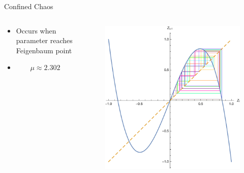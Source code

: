 \documentclass{beamer}
\begin{document}
\begin{frame}{Confined Chaos}
	\begin{columns}
		\begin{column}{0.5\textwidth}
			\begin{itemize}
				\item
					\centering
					Occurs when parameter reaches Feigenbaum point

				\item
					\begin{equation*}
						\mu\approx2.302
					\end{equation*}
			\end{itemize}
		\end{column}
		\begin{column}{0.5\textwidth}
			\begin{figure}
				\centering
				\includegraphics[width=\textwidth]{contained_chaos.pdf}
			\end{figure}
		\end{column}
	\end{columns}
\end{frame}
\end{document}

